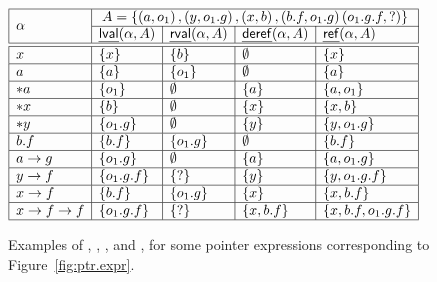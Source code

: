 \documentclass[a4paper,11pt,fleqn]{article}
\begin{document}
\begin{figure}[t]
\begin{center}
$
\begin{array}{|l|l|l|l|l|}
\hline
\multirow{2}{*}{$\alpha$}
	&
	\multicolumn{4}{c|}{
	A = \left\{
	\left(a, o_1 \right),
	\left(y, o_1.g \right),
	\left(x, b \right),
	\left(b.f, o_1.g \right)
	\left(o_1.g.f, ? \right)
	\right\}
	}
	\\ \cline{2-5}
	& \lval(\alpha,A)
	& \rval(\alpha,A)
	& \derefp(\alpha,A)
	& \refp(\alpha,A)
	\\ \hline\hline
x 
	& \{ x \}
	& \{ b \}
	& \emptyset
	& \{ x \}
	\\ \hline
a 
	& \{ a \}
	& \{ o_1 \}
	& \emptyset
	& \{ a \}
	\\ \hline
*a 
	& \{ o_1 \}
	& \emptyset
	& \{ a \}
	& \{ a, o_1 \}
	\\ \hline
*x 
	& \{ b \}
	& \emptyset
	& \{ x \}
	& \{ x, b \}
	\\ \hline
*y 
	& \{ o_1.g \}
	& \emptyset
	& \{ y \}
	& \{ y, o_1.g \}
	\\ \hline
b.f
	& \{ b.f \}
	& \{ o_1.g \}
	& \emptyset
	& \{ b.f \}
	\\ \hline
a \rightarrow g
	& \{ o_1.g \}
	& \emptyset
	& \{ a \}
	& \{ a, o_1.g \}
	\\ \hline
y \rightarrow f
	& \{ o_1.g.f \}
	& \{ ? \}
	& \{ y \}
	& \{ y, o_1.g.f \}
	\\ \hline
x \rightarrow f
	& \{ b.f \}
	& \{ o_1.g \}
	& \{ x \}
	& \{ x, b.f \}
	\\ \hline
x \rightarrow f \rightarrow f
	& \{ o_1.g.f \}
	& \{ ? \}
	& \{ x, b.f \}
	& \{ x, b.f, o_1.g.f \}
	\\ \hline
\end{array}
$
\end{center}
\caption{Examples of \lval, \rval, \derefp, and , for some pointer expressions corresponding to Figure~\protect\ref{fig:ptr.expr}.}
\label{fig:aux.fn.exmp}
\end{figure}
\end{document}
